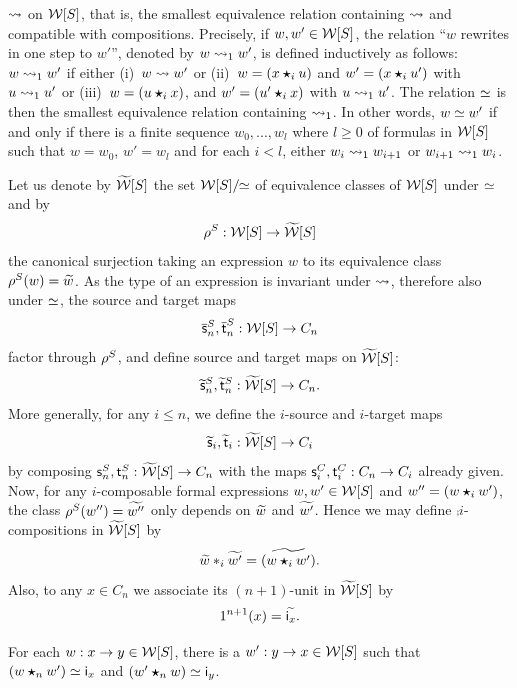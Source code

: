   $\leadsto$ on $\mathcal{W}[S]$, that is, the smallest equivalence relation containing $\leadsto$ and compatible with compositions. Precisely, if
  $w,w'\in\mathcal{W}[S]$, the relation  ``$w$ rewrites in one step
  to $w'$'',
  denoted by $w\leadsto_1 w'$, is defined inductively as follows: $w\leadsto_1
  w'$ if either (i)~$w\leadsto w'$ or (ii)~$w=(x\bm{\star}_{i} u)$ and $w'=(x\bm{\star}_{i} u')$
  with $u\leadsto_1 u'$ or (iii)~$w=(u\bm{\star}_{i} x)$,
  and $w'=(u'\bm{\star}_{i} x)$ with $u\leadsto_1 u'$. The relation $\simeq$ is
  then the smallest equivalence relation containing $\leadsto_1$. In other
  words, $w\simeq w'$ if and only if there is a finite sequence
  $w_0,...,w_l$ where $l\geq 0$ of formulas in $\mathcal{W}[S]$ such that
  $w=w_0$, $w'=w_l$ and for each $i<l$, either $w_i\leadsto_1 w_{i+1}$ or
  $w_{i+1}\leadsto_1 w_i$.

  Let us denote by $\widetilde{\mathcal{W}}[S]$
  the set $\mathcal{W}[S]/\!\!\simeq$ of equivalence classes of $\mathcal{W}[S]$ under
  $\simeq$ and by
  \[\rho^{S}: \mathcal{W}[S]\to \widetilde{\mathcal{W}}[S]\]
  the canonical surjection taking an expression $w$ to its
  equivalence class $\rho^{S}(w)=\widetilde{w}$. As the type of an
  expression is invariant under $\leadsto$, therefore also under $\simeq$, 
 the source and target maps
  \[\overline{\mathsf{s}}_{n}^S,\overline{\mathsf{t}}_{n}^S:\mathcal{W}[S]\to C_n\]
  factor through $\rho^{S}$, and define source and target maps on $\widetilde{\mathcal{W}}[S]$:
  \[\widetilde{\mathsf{s}}_{n}^S,\widetilde{\mathsf{t}}_{n}^S:\widetilde{\mathcal{W}}[S]\to C_n.\]
  More generally, for any $i\leq n$, we define the $i$-source and
  $i$-target maps
  \[\widetilde{\mathsf{s}}_{i},\widetilde{\mathsf{t}}_{i}:\widetilde{\mathcal{W}}[S]\to C_i\]
  by composing $\mathsf{s}_{n}^S,\mathsf{t}_{n}^S:\widetilde{\mathcal{W}}[S]\to C_n$ with the maps $\mathsf{s}_{i}^C,\mathsf{t}_{i}^C:C_n\to C_i$ already given. Now, for any $i$-composable formal expressions
  $w,w'\in \mathcal{W}[S]$ and $w''=(w\bm{\star}_{i} w')$, the class $\rho^{S}(w'')=\widetilde{w''}$ only
  depends on $\widetilde{w}$ and $\widetilde{w'}$. Hence we may define 
 $\comp i$-compositions in $\widetilde{\mathcal{W}}[S]$ by
 \[\widetilde{w}\ast_{i}\widetilde{w'}=\widetilde{(w\bm{\star}_{i} w')}.\]
 Also, to any $x\in C_n$ we associate its $(n{+}1)$-unit in $\widetilde{\mathcal{W}}[S]$ by
  \[1^{n+1}(x)=\widetilde{\mathsf{i}_{x}}.\]
  \begin{lemma}\label{lemma:inv}
    For each $w:x\to y\in \mathcal{W}[S]$, there is a $w':y\to x\in \mathcal{W}[S]$
    such that $(w\bm{\star}_{n} w')\simeq\mathsf{i}_{x}$ and $(w'\bm{\star}_{n} w)\simeq
    \mathsf{i}_{y}$.
  \end{lemma}
